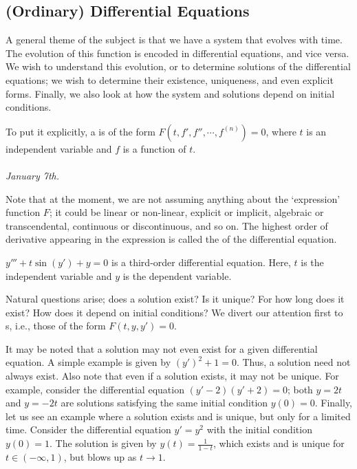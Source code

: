 \subsection{(Ordinary) Differential Equations}

A general theme of the subject is that we have a system that evolves with time. The evolution of this function is encoded in differential equations, and vice versa. We wish to understand this evolution, or to determine solutions of the differential equations; we wish to determine their existence, uniqueness, and even explicit forms. Finally, we also look at how the system and solutions depend on initial conditions.

To put it explicitly, a  is of the form $F(t,f',f'',\cdots,f^{(n)}) = 0$, where $t$ is an independent variable and $f$ is a function of $t$.
\\ \\
\textit{January 7th.}

Note that at the moment, we are not assuming anything about the `expression' function $F$; it could be linear or non-linear, explicit or implicit, algebraic or transcendental, continuous or discontinuous, and so on. The highest order of derivative appearing in the expression is called the  of the differential equation.

\begin{example}
    $y''' + t \sin (y') + y = 0$ is a third-order differential equation. Here, $t$ is the independent variable and $y$ is the dependent variable.
\end{example}

Natural questions arise; does a solution exist? Is it unique? For how long does it exist? How does it depend on initial conditions? We divert our attention first to s, i.e., those of the form $F(t,y,y') = 0$.


It may be noted that a solution may not even exist for a given differential equation. A simple example is given by $(y')^{2} + 1 = 0$. Thus, a solution need not always exist. Also note that even if a solution exists, it may not be unique. For example, consider the differential equation $(y' - 2)(y' + 2) = 0$; both $y = 2t$ and $y = -2t$ are solutions satisfying the same initial condition $y(0) = 0$. Finally, let us see an example where a solution exists and is unique, but only for a limited time. Consider the differential equation $y' = y^{2}$ with the initial condition $y(0) = 1$. The solution is given by $y(t) = \frac{1}{1 - t}$, which exists and is unique for $t \in (-\infty, 1)$, but blows up as $t \to 1$.
